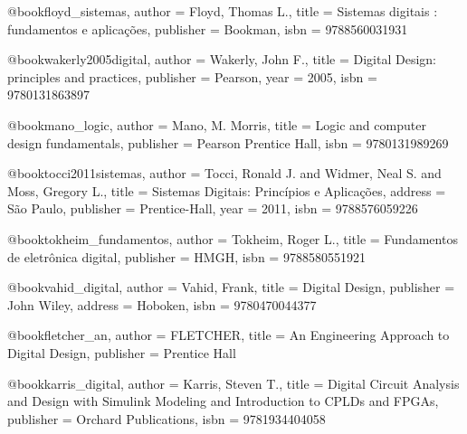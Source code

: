 @book{floyd_sistemas,
  author = {Floyd, Thomas L.},
  title = {Sistemas digitais : fundamentos e aplicações},
  publisher = {Bookman},
  isbn = {9788560031931}
}

@book{wakerly2005digital,
  author = {Wakerly, John F.},
  title = {Digital Design: principles and practices},
  publisher = {Pearson},
  year = {2005},
  isbn = {9780131863897}
}

@book{mano_logic,
  author = {Mano, M. Morris},
  title = {Logic and computer design fundamentals},
  publisher = {Pearson Prentice Hall},
  isbn = {9780131989269}
}

@book{tocci2011sistemas,
  author = {Tocci, Ronald J. and Widmer, Neal S. and Moss, Gregory L.},
  title = {Sistemas Digitais: Princípios e Aplicações},
  address = {São Paulo},
  publisher = {Prentice-Hall},
  year = {2011},
  isbn = {9788576059226}
}

@book{tokheim_fundamentos,
  author = {Tokheim, Roger L.},
  title = {Fundamentos de eletrônica digital},
  publisher = {HMGH},
  isbn = {9788580551921}%
}

@book{vahid_digital,
  author = {Vahid, Frank},
  title = {Digital Design},
  publisher = {John Wiley},
  address = {Hoboken},
  isbn = {9780470044377}
}

@book{fletcher_an,
  author = {FLETCHER},
  title = {An Engineering Approach to Digital Design},
  publisher = {Prentice Hall}
}

@book{karris_digital,
  author = {Karris, Steven T.},
  title = {Digital Circuit Analysis and Design with Simulink Modeling and Introduction to CPLDs and FPGAs},
  publisher = {Orchard Publications},
  isbn = {9781934404058}%
}

